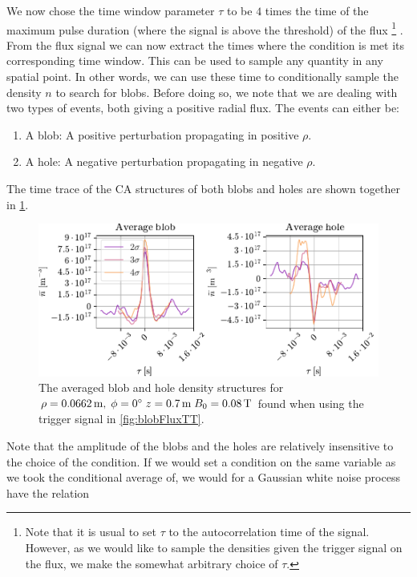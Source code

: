 We now chose the time window parameter $\tau$ to be $4$ times the time of the maximum pulse duration (where the signal is above the threshold) of the flux%
\footnote{Note that it is usual to set $\tau$ to the autocorrelation time of the signal.
    However, as we would like to sample the densities given the trigger signal on the flux, we make the somewhat arbitrary choice of $\tau$.
}%
.
From the flux signal we can now extract the times where the condition is met its corresponding time window.
This can be used to sample any quantity in any spatial point.
In other words, we can use these time to conditionally sample the density $n$ to search for blobs.
Before doing so, we note that we are dealing with two types of events, both giving a positive radial flux.
The events can either be:
%
\begin{enumerate}[noitemsep]
    \item A blob: A positive perturbation propagating in positive $\rho$.
    \item A hole: A negative perturbation propagating in negative $\rho$.
\end{enumerate}
%
The time trace of the CA structures of both blobs and holes are shown together in \cref{fig:blobAndHoleTT}.
%
\begin{figure}[htb]
    \begin{center}
        \includegraphics{fig/results/blobs/blobsAndHoles-B0_008Tweak}
    \end{center}
    \caption{The averaged blob and hole density structures for $\rho=0.0662\, \text{m},\;\phi=0^{\circ}\;z=0.7\, \text{m}\;B_0=0.08\, \text{T}$ found when using the trigger signal in \cref{fig:blobFluxTT}.}
    \label{fig:blobAndHoleTT}
\end{figure}
%
Note that the amplitude of the blobs and the holes are relatively insensitive to the choice of the condition.
If we would set a condition on the same variable as we took the conditional average of, we would for a Gaussian white noise process have the relation \cite{Edwards1983}
